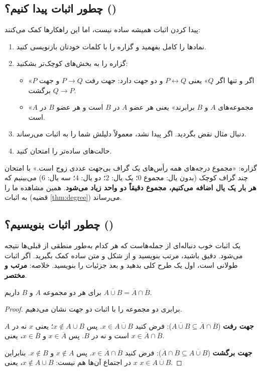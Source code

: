 \subsection{چطور اثبات پیدا کنیم؟ ()}
پیدا کردن اثبات همیشه ساده نیست، اما این راهکارها کمک می‌کنند:
\begin{enumerate}
\item نمادها را کامل بفهمید و گزاره را با کلمات خودتان بازنویسی کنید.
\item گزاره را به بخش‌های کوچک‌تر بشکنید:
  \begin{itemize}
  \item «$P$ اگر و تنها اگر $Q$» یعنی $P\leftrightarrow Q$ و دو جهت دارد: جهت رفت $P\rightarrow Q$ و جهت برگشت $Q\rightarrow P$.
  \item «مجموعه‌های $A$ و $B$ برابرند» یعنی هر عضو $A$ در $B$ است و هر عضو $B$ در $A$ است.
  \end{itemize}
\item دنبال مثال نقض بگردید. اگر پیدا نشد، معمولاً دلیلش شما را به اثبات می‌رساند.
\item حالت‌های ساده‌تر را امتحان کنید.
\end{enumerate}

\begin{example}
گزاره: «مجموع درجه‌های همه رأس‌های یک گراف بی‌جهت عددی زوج است.» با امتحان چند گراف کوچک (بدون یال: مجموع $0$؛ یک یال: $2$؛ دو یال: $4$؛ سه یال: $6$) می‌بینیم که \textbf{هر بار یک یال اضافه می‌کنیم، مجموع دقیقاً دو واحد زیاد می‌شود}. همین مشاهده ما را به اثبات (قضیه \ref{thm:degree}) می‌رساند.
\end{example}

\subsection{چطور اثبات بنویسیم؟ ()}
یک اثبات خوب دنباله‌ای از جمله‌هاست که هر کدام به‌طور منطقی از قبلی‌ها نتیجه می‌شود. دقیق باشید، مرتب بنویسید و از شکل و متن ساده کمک بگیرید. اگر اثبات طولانی است، اول یک طرح کلی بدهید و بعد جزئیات را بنویسید. خلاصه: \textbf{مرتب و مختصر}.

\begin{theorem}[دمورگان]
برای هر دو مجموعه $A$ و $B$ داریم $\overline{A\cup B}=\overline{A}\cap\overline{B}$.
\end{theorem}
\begin{proof}
برابری دو مجموعه را با اثبات دو جهت نشان می‌دهیم.

\textbf{جهت رفت} ($\overline{A\cup B}\subseteq\overline{A}\cap\overline{B}$): فرض کنید $x\in\overline{A\cup B}$. پس $x\notin A\cup B$؛ یعنی $x$ نه در $A$ است و نه در $B$. پس $x\in\overline{A}$ و $x\in\overline{B}$، یعنی $x\in\overline{A}\cap\overline{B}$.

\textbf{جهت برگشت} ($\overline{A}\cap\overline{B}\subseteq\overline{A\cup B}$): فرض کنید $x\in\overline{A}\cap\overline{B}$. پس $x\notin A$ و $x\notin B$. بنابراین $x$ در اجتماع آن‌ها هم نیست: $x\notin A\cup B$، یعنی $x\in\overline{A\cup B}$.
\end{proof}


